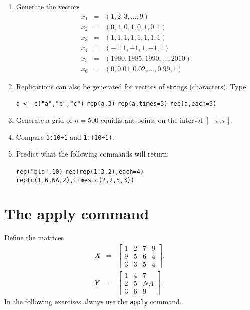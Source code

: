 \documentclass{article}
\begin{document}
\begin{enumerate}
\item Generate the vectors%
\begin{eqnarray*}
x_{1} &=&\left( 1,2,3,\ldots ,9\right) \\
x_{2} &=&\left( 0,1,0,1,0,1,0,1\right) \\
x_{3} &=&\left( 1,1,1,1,1,1,1,1\right) \\
x_{4} &=&\left( -1,1,-1,1,-1,1\right) \\
x_{5} &=&\left( 1980,1985,1990,\ldots ,2010\right) \\
x_{6} &=&\left( 0,0.01,0.02,\ldots ,0.99,1\right)
\end{eqnarray*}

\item Replications can also be generated for vectors of strings
(characters). Type

\texttt{a <- c("{}a","b","{}c")}\newline
\texttt{rep(a,3)}\newline
\texttt{rep(a,times=3)}\newline
\texttt{rep(a,each=3)}

\item Generate a grid of $n=500$ equidistant points on the interval $[-\pi
,\pi ]$.

\item Compare \texttt{1:10+1} and \texttt{1:(10+1)}.

\item Predict what the following commands will return:

\texttt{rep("bla",10)}\newline
\texttt{rep(rep(1:3,2),each=4)}\newline
\texttt{rep(c(1,6,NA,2),times=c(2,2,5,3))}
\end{enumerate}
\newpage


\section{The apply command}

Define the matrices%
\begin{eqnarray*}
X &=&\left[ 
\begin{array}{llll}
1 & 2 & 7 & 9 \\ 
9 & 5 & 6 & 4 \\ 
3 & 3 & 5 & 4%
\end{array}%
\right] , \\
Y &=&\left[ 
\begin{array}{lll}
1 & 4 & 7 \\ 
2 & 5 & NA \\ 
3 & 6 & 9%
\end{array}%
\right] .
\end{eqnarray*}%
In the following exercises always use the \texttt{apply} command.
\end{document}
